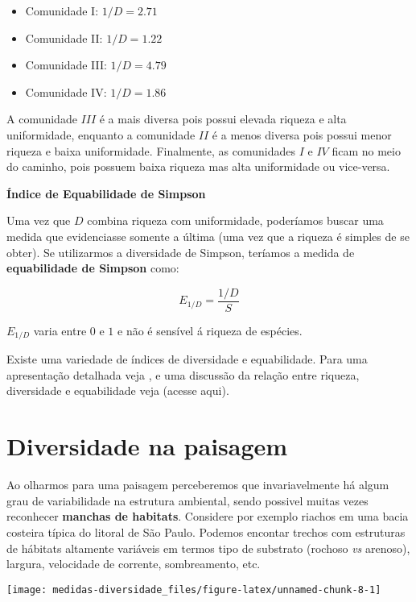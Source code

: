 \documentclass[
]{book}
\begin{document}
\begin{itemize}
\item
  Comunidade I: \(1/D = 2.71\)
\item
  Comunidade II: \(1/D = 1.22\)
\item
  Comunidade III: \(1/D = 4.79\)
\item
  Comunidade IV: \(1/D = 1.86\)
\end{itemize}

A comunidade \(III\) é a mais diversa pois possui elevada riqueza e alta uniformidade, enquanto a comunidade \(II\) é a menos diversa pois possui menor riqueza e baixa uniformidade. Finalmente, as comunidades \(I\) e \(IV\) ficam no meio do caminho, pois possuem baixa riqueza mas alta uniformidade ou vice-versa.

\textbf{Índice de Equabilidade de Simpson}

Uma vez que \(D\) combina riqueza com uniformidade, poderíamos buscar uma medida que evidenciasse somente a última (uma vez que a riqueza é simples de se obter). Se utilizarmos a diversidade de Simpson, teríamos a medida de \textbf{equabilidade de Simpson} como:

\[E_{1/D} = \frac{1/D}{S}\]

\(E_{1/D}\) varia entre \(0\) e \(1\) e não é sensível á riqueza de espécies.

Existe uma variedade de índices de diversidade e equabilidade. Para uma apresentação detalhada veja \citet{magurran2011medindo}, e uma discussão da relação entre riqueza, diversidade e equabilidade veja \citet{melo2008ganhamos} (acesse aqui).

\hypertarget{diversidade-na-paisagem}{%
\section{Diversidade na paisagem}\label{diversidade-na-paisagem}}

Ao olharmos para uma paisagem perceberemos que invariavelmente há algum grau de variabilidade na estrutura ambiental, sendo possivel muitas vezes reconhecer \textbf{manchas de habitats}. Considere por exemplo riachos em uma bacia costeira típica do litoral de São Paulo. Podemos encontar trechos com estruturas de hábitats altamente variáveis em termos tipo de substrato (rochoso \emph{vs} arenoso), largura, velocidade de corrente, sombreamento, etc.

\begin{center}\texttt{[image: medidas-diversidade\_files/figure-latex/unnamed-chunk-8-1]} \end{center}
\end{document}
